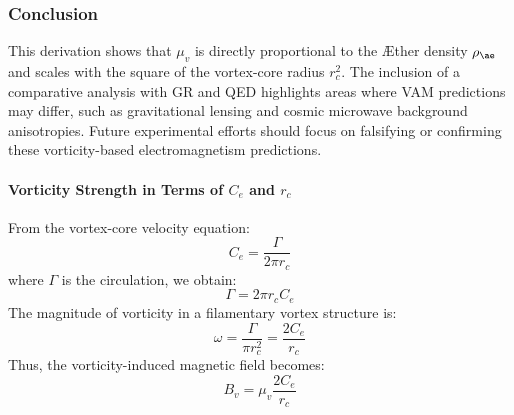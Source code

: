 \subsubsection*{Conclusion}
This derivation shows that \( \mu_v \) is directly proportional to the \AE ther density \( \rho_{\ae} \) and scales with the square of the vortex-core radius \( r_c^2 \). The inclusion of a comparative analysis with GR and QED highlights areas where VAM predictions may differ, such as gravitational lensing and cosmic microwave background anisotropies. Future experimental efforts should focus on falsifying or confirming these vorticity-based electromagnetism predictions.



    \paragraph*{Vorticity Strength in Terms of $C_e$ and $r_c$}
    From the vortex-core velocity equation:
    \begin{equation}
        C_e = \frac{\Gamma}{2\pi r_c}
    \end{equation}
    where $\Gamma$ is the circulation, we obtain:
    \begin{equation}
        \Gamma = 2\pi r_c C_e
    \end{equation}
    The magnitude of vorticity in a filamentary vortex structure is:
    \begin{equation}
        \omega = \frac{\Gamma}{\pi r_c^2} = \frac{2 C_e}{r_c}
    \end{equation}
    Thus, the vorticity-induced magnetic field becomes:
    \begin{equation}
        B_v = \mu_v \frac{2 C_e}{r_c}
    \end{equation}

